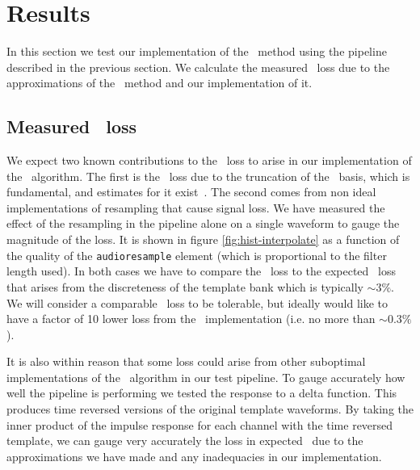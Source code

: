 \section{Results}
\label{SECIV}\label{sec:results}

In this section we test our implementation of the \lloid\ method using the
pipeline described in the previous section.  We calculate the measured \SNR\
loss due to the approximations of the \lloid\ method and our implementation of
it.
%
%
%


\subsection{Measured \SNR\ loss}

We expect two known contributions to the \SNR\ loss to arise in our
implementation of the \lloid\ algorithm.  The first is the \SNR\ loss due to
the truncation of the \SVD\ basis, which is fundamental, and estimates for it
exist~\cite{Cannon:2010p10398}.  The second comes from non ideal
implementations of resampling that cause signal loss.  We have measured the
effect of the resampling in the pipeline alone on a single waveform to gauge
the magnitude of the loss.  It is shown in figure \ref{fig:hist-interpolate} as a
function of the quality of the {\tt audioresample} element (which is
proportional to the filter length used).  In both cases we have to compare the
\SNR\ loss to the expected \SNR\ loss that arises from the discreteness of the
template bank which is typically $\sim 3\%$.  We will consider a comparable
\SNR\ loss to be tolerable, but ideally would like to have a factor of 10 lower
loss from the \lloid\ implementation (i.e. no more than $\sim 0.3 \%$).

It is also within reason that some \SNR loss could arise from other suboptimal
implementations of the \lloid\ algorithm in our test pipeline.  To gauge
accurately how well the pipeline is performing we tested the response to a
delta function.  This produces time reversed versions of the original template
waveforms. By taking the inner product of the impulse response for each channel
with the time reversed template, we can gauge very accurately the loss in
expected \SNR\ due to the approximations we have made and any inadequacies in
our implementation. 

